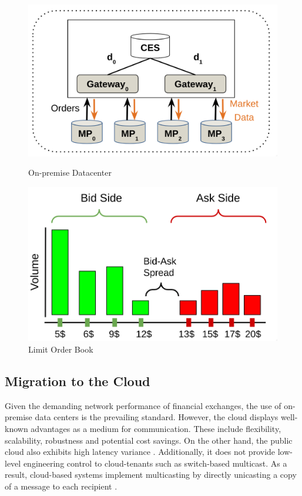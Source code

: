 \begin{figure}[h!]
  \begin{center}
    \begin{minipage}{0.45\textwidth}
      \centering
      \includegraphics[height=0.20\textheight]{./assets/architecture.png}
      \caption{On-premise Datacenter}
      \label{fig:exchange}
    \end{minipage}
    \hfill
    \begin{minipage}{0.45\textwidth}
      \centering
      \includegraphics[height=0.20\textheight]{./assets/LOB.png}
      \caption{Limit Order Book}
      \label{fig:lob}
    \end{minipage}
  \end{center}
\end{figure}

\subsection{Migration to the Cloud}
Given the demanding network performance of financial exchanges, the use of 
on-premise data centers is the prevailing standard.
However, the cloud displays well-known advantages as a medium for communication. 
These include flexibility, scalability, robustness and potential cost savings. 
On the other hand, the public cloud also exhibits high latency variance \cite{cloudy}.
Additionally, it does not provide low-level engineering control to cloud-tenants such as switch-based multicast. 
As a result, cloud-based systems implement multicasting by directly unicasting a copy of a message 
to each recipient \cite{nezha, cloudex, octopus, dbo}.


